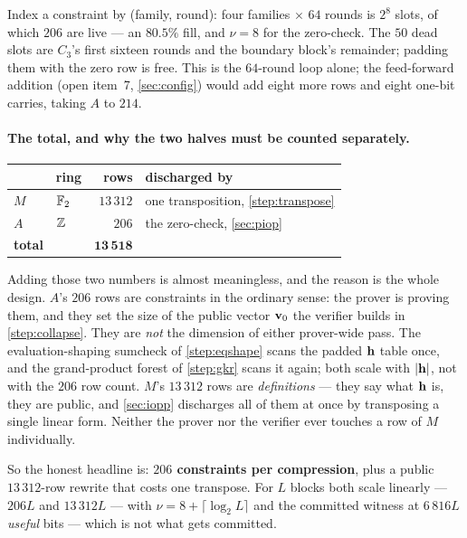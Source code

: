 Index a constraint by (family, round): four families $\times$ $64$ rounds is
$2^8$ slots, of which $206$ are live --- an $80.5\%$ fill, and $\nu=8$ for the
zero-check. The $50$ dead slots are $C_3$'s first sixteen rounds and the
boundary block's remainder; padding them with the zero row is free. This is the $64$-round
loop alone; the feed-forward addition (open item~7, \cref{sec:config}) would add
eight more rows and eight one-bit carries, taking $A$ to $214$.

\paragraph{The total, and why the two halves must be counted separately.}

\begin{center}\small
\begin{tabular}{@{}llrl@{}}
\toprule
& ring & rows & discharged by\\
\midrule
$M$ & $\mathbb{F}_2$ & $13\,312$ & one transposition, \cref{step:transpose}\\
$A$ & $\mathbb{Z}$    & $206$     & the zero-check, \cref{sec:piop}\\
\midrule
\textbf{total} & & $\mathbf{13\,518}$ & \\
\bottomrule
\end{tabular}
\end{center}

\noindent
Adding those two numbers is almost meaningless, and the reason is the whole
design. $A$'s $206$ rows are constraints in the ordinary sense: the prover is
proving them, and they set the size of the public vector $\mathbf{v}_0$ the verifier builds in
\cref{step:collapse}. They are \emph{not} the dimension of either
prover-wide pass.  The evaluation-shaping sumcheck of \cref{step:eqshape} scans
the padded $\mathbf{h}$ table once, and the grand-product forest of \cref{step:gkr}
scans it again; both scale with $|\mathbf{h}|$, not with the $206$ row count.
$M$'s $13\,312$ rows are \emph{definitions} --- they say what $\mathbf{h}$ is, they are
public, and \cref{sec:iopp} discharges all of them at once by transposing a
single linear form. Neither the prover nor the verifier ever touches a row of
$M$ individually.

So the honest headline is: \textbf{$206$ constraints per compression}, plus a
public $13\,312$-row rewrite that costs one transpose. For $L$ blocks both
scale linearly --- $206L$ and $13\,312L$ --- with $\nu=8+\lceil\log_2 L\rceil$
and the committed witness at $6\,816L$ \emph{useful} bits --- which is not what
gets committed.

